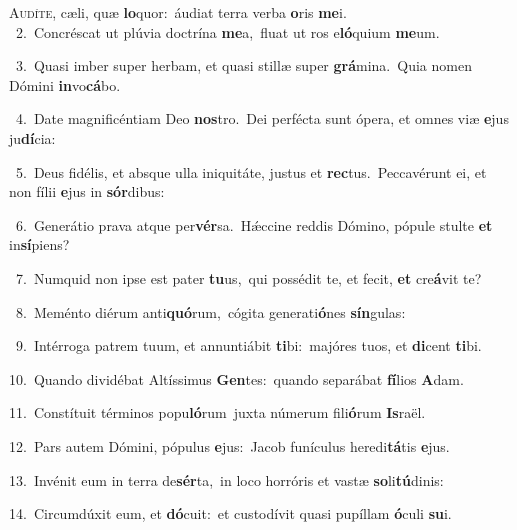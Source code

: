 \lettrine{\initial\textcolor{\initialcolor}{A}}{udíte,} cæli, quæ \textbf{lo}\-quor:~\star áudiat terra verba \textbf{o}\-ris \textbf{me}\-i.\\
{\numbfont\textcolor{\numbcolor}{~2.}}~Concréscat ut plúvia doctrína \textbf{me}\-a,~\star fluat ut ros e\-\textbf{ló}\-quium \textbf{me}\-um.\par
{\numbfont\textcolor{\numbcolor}{~3.}}~Quasi imber super herbam, et quasi stillæ super \textbf{grá}\-mina.~\star Quia nomen Dómini \textbf{in}\-vo\-\textbf{cá}\-bo.\par
{\numbfont\textcolor{\numbcolor}{~4.}}~Date magnificéntiam Deo \textbf{nos}\-tro.~\star Dei perfécta sunt ópera, et omnes viæ \textbf{e}\-jus ju\-\textbf{dí}\-cia:\par
{\numbfont\textcolor{\numbcolor}{~5.}}~Deus fidélis, et absque ulla iniquitáte, justus et \textbf{rec}\-tus.~\star Peccavérunt ei, et non fílii \textbf{e}\-jus in \textbf{sór}\-dibus:\par
{\numbfont\textcolor{\numbcolor}{~6.}}~Generátio prava atque per\-\textbf{vér}\-sa.~\star Hǽccine reddis Dómino, pópule stulte \textbf{et} in\-\textbf{sí}\-piens?\par
{\numbfont\textcolor{\numbcolor}{~7.}}~Numquid non ipse est pater \textbf{tu}\-us,~\star qui possédit te, et fecit, \textbf{et} cre\-\textbf{á}\-vit te?\par
{\numbfont\textcolor{\numbcolor}{~8.}}~Meménto diérum anti\-\textbf{quó}\-rum,~\star cógita generati\-\textbf{ó}\-nes \textbf{sín}\-gulas:\par
{\numbfont\textcolor{\numbcolor}{~9.}}~Intérroga patrem tuum, et annuntiábit \textbf{ti}\-bi:~\star majóres tuos, et \textbf{di}\-cent \textbf{ti}\-bi.\par
{\numbfont\textcolor{\numbcolor}{10.}}~Quando dividébat Altíssimus \textbf{Gen}\-tes:~\star quando separábat \textbf{fí}\-lios \textbf{A}\-dam.\par
{\numbfont\textcolor{\numbcolor}{11.}}~Constítuit términos popu\-\textbf{ló}\-rum~\star juxta númerum fili\-\textbf{ó}\-rum \textbf{Is}\-raël.\par
{\numbfont\textcolor{\numbcolor}{12.}}~Pars autem Dómini, pópulus \textbf{e}\-jus:~\star Jacob funículus heredi\-\textbf{tá}\-tis \textbf{e}\-jus.\par
{\numbfont\textcolor{\numbcolor}{13.}}~Invénit eum in terra de\-\textbf{sér}\-ta,~\star in loco horróris et vastæ \textbf{so}\-li\-\textbf{tú}\-dinis:\par
{\numbfont\textcolor{\numbcolor}{14.}}~Circumdúxit eum, et \textbf{dó}\-cuit:~\star et custodívit quasi pupíllam \textbf{ó}\-culi \textbf{su}\-i.\par
